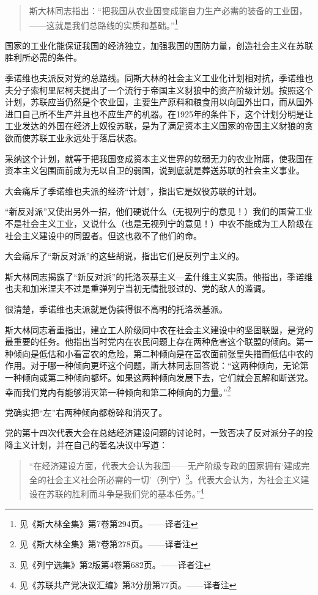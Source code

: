 \begin{quotation}
斯大林同志指出：“把我国从农业国变成能自力生产必需的装备的工业国，——这就是我们总路线的实质和基础。”\footnote{见《斯大林全集》第7卷第294页。——译者注}
\end{quotation}

国家的工业化能保证我国的经济独立，加强我国的国防力量，创造社会主义在苏联胜利所必需的条件。

季诺维也夫派反对党的总路线。同斯大林的社会主义工业化计划相对抗，季诺维也夫分子索柯里尼柯夫提出了一个流行于帝国主义豺狼中的资产阶级计划。按照这个计划，苏联应当仍然是个农业国，主要生产原料和粮食用以向国外出口，而从国外进口自己所不生产并且也不应生产的机器。在1925年的条件下，这个计划分明是让工业发达的外国在经济上奴役苏联，是为了满足资本主义国家的帝国主义豺狼的贪欲而使苏联工业永远处于落后状态。

采纳这个计划，就等于把我国变成资本主义世界的软弱无力的农业附庸，使我国在资本主义包围面前成为无以自卫的弱国，说到底就是葬送苏联的社会主义事业。

大会痛斥了季诺维也夫派的经济“计划”，指出它是奴役苏联的计划。

“新反对派”又使出另外一招，他们硬说什么（无视列宁的意见！）我们的国营工业不是社会主义工业，又说什么（也是无视列宁的意见！）中农不能成为工人阶级在社会主义建设中的同盟者。但这也救不了他们的命。

大会痛斥了“新反对派”的这些胡说，指出它们是反列宁主义的。

斯大林同志揭露了“新反对派”的托洛茨基主义—孟什维主义实质。他指出，季诺维也夫和加米涅夫不过是重弹列宁当初无情批驳过的、党的敌人的滥调。

很清楚，季诺维也夫派就是伪装得很不高明的托洛茨基派。

斯大林同志着重指出，建立工人阶级同中农在社会主义建设中的坚固联盟，是党的最重要的任务。他指出当时党内在农民问题上存在两种危害这个联盟的倾向。第一种倾向是低估和小看富农的危险，第二种倾向是在富农面前张皇失措而低估中农的作用。对于哪一种倾向更坏这个问题，斯大林同志回答说：“这两种倾向，无论第一种倾向或第二种倾向都坏。如果这两种倾向发展下去，它们就会瓦解和断送党。幸而我们党内有能够消灭第一种倾向和第二种倾向的力量。”\footnote{见《斯大林全集》第7卷第278页。——译者注}

党确实把“左”右两种倾向都粉碎和消灭了。

党的第十四次代表大会在总结经济建设问题的讨论时，一致否决了反对派分子的投降主义计划，并在自己的著名决议中写道：

\begin{quotation}
“在经济建设方面，代表大会认为我国——无产阶级专政的国家拥有‘建成完全的社会主义社会所必需的一切’（列宁）\footnote{见《列宁选集》第2版第4卷第682页。——译者注}。代表大会认为，为社会主义建设在苏联的胜利而斗争是我们党的基本任务。”\footnote{见《苏联共产党决议汇编》第3分册第77页。——译者注}
\end{quotation}

